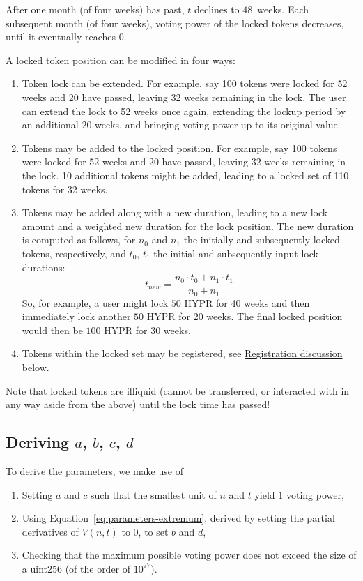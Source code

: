 \documentclass{article}
\begin{document}
After one month (of four weeks) has past, $t$ declines to $48$~weeks.
Each subsequent month (of four weeks), voting power of the locked tokens decreases, until it eventually reaches $0$.

A locked token position can be modified in four ways:
\begin{enumerate}
    \item Token lock can be extended.
       For example, say 100 tokens were locked for 52 weeks and 20 have passed, leaving 32 weeks remaining in the lock.
       The user can extend the lock to 52 weeks once again, extending the lockup period by an additional 20 weeks, and bringing voting power up to its original value.
    \item Tokens may be added to the locked position.
       For example, say 100 tokens were locked for 52 weeks and 20 have passed, leaving 32 weeks remaining in the lock.
       10 additional tokens might be added, leading to a locked set of 110 tokens for 32 weeks.
    \item Tokens may be added along with a new duration, leading to a new lock amount and a weighted new duration for the lock position.
       The new duration is computed as follows, for $n_0$ and $n_1$ the initially and subsequently locked tokens, respectively, and $t_0$, $t_1$ the initial and subsequently input lock durations:
       \begin{equation}
       t_{new} = \frac{n_0 \cdot t_0 + n_1 \cdot t_1}{n_0 + n_1}
       \end{equation}
       So, for example, a user might lock $50$ HYPR for 40 weeks and then immediately lock another $50$ HYPR for 20 weeks.
       The final locked position would then be $100$ HYPR for 30 weeks.
    \item Tokens within the locked set may be registered, see \hyperref[sec:registration]{Registration discussion below}.
\end{enumerate}

Note that locked tokens are illiquid (cannot be transferred, or interacted with in any way aside from the above) until the lock time has passed!

\subsection{Deriving $a$, $b$, $c$, $d$}\label{sec:deriving-parameters}

To derive the parameters, we make use of
\begin{enumerate}
	\item Setting $a$ and $c$ such that the smallest unit of $n$ and $t$ yield $1$ voting power,
	\item Using Equation~\ref{eq:parameters-extremum}, derived by setting the partial derivatives of $V(n,t)$ to $0$, to set $b$ and $d$,
	\item Checking that the maximum possible voting power does not exceed the size of a uint256 (of the order of $10^{77}$).
\end{enumerate}
\end{document}
